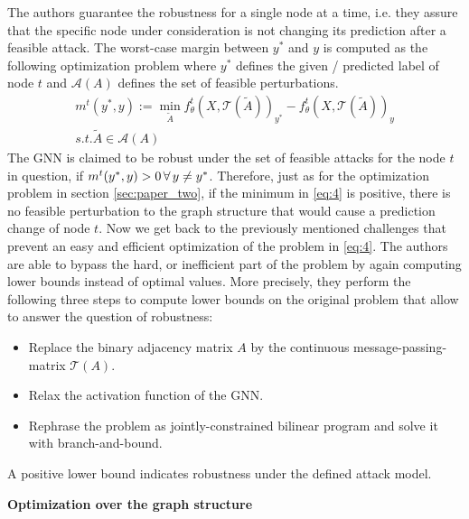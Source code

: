 \documentclass[a4paper,preprint]{sig-alternate}
\begin{document}
The authors guarantee the robustness for a single node at a time, i.e. they assure that the specific node under 
consideration is not changing its prediction after a feasible attack.
The worst-case margin between $y^{\ast}$ and $y$ is computed as the following optimization problem where $y^{\ast}$ defines the given / predicted 
label of node $t$ and $\mathcal{A}(A)$ defines the set of feasible perturbations.
\begin{gather}
\label{eq:4}
    m^t (y^{\ast}, y) := \min_{\tilde{A}} f_{\theta}^t (X, \mathcal{T}(\tilde{A}))_{y^{\ast}}
    - f_{\theta}^t (X, \mathcal{T}(\tilde{A}))_y \\
    s.t. \tilde{A} \in \mathcal{A}(A) \nonumber
\end{gather}
The GNN is claimed to be robust under the set of feasible attacks for the node $t$ in question,
if $m^t (y^{\ast}, y) > 0 \thinspace \forall \thinspace y \neq y^{\ast}$.
Therefore, just as for the optimization problem in section \ref{sec:paper_two}, if the minimum in \ref{eq:4} is positive, 
there is no feasible perturbation to the graph structure that would cause a prediction change of node $t$. \cite{10.1145/3394486.3403217}\newline
Now we get back to the previously mentioned challenges that prevent an easy and efficient optimization 
of the problem in \ref{eq:4}.
The authors are able to bypass the hard, or inefficient part of the problem by again computing lower bounds instead of optimal values.
More precisely, they perform the following three steps to compute lower bounds on the original problem that
allow to answer the question of robustness:
\begin{itemize}
    \item Replace the binary adjacency matrix $A$ by the continuous message-passing-matrix $\mathcal{T}(A)$.
    \item Relax the activation function of the GNN.
    \item Rephrase the problem as jointly-constrained bilinear program and solve it with branch-and-bound.
\end{itemize}
A positive lower bound indicates robustness under the defined attack model. \cite{10.1145/3394486.3403217}\newline

\textbf{Optimization over the graph structure}\newline
\end{document}
